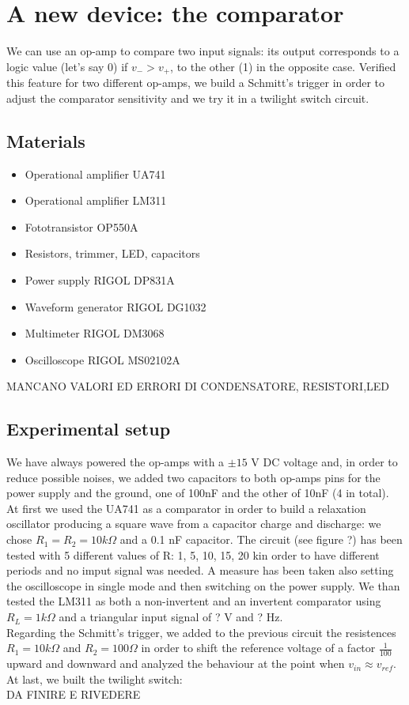 \chapter{A new device: the comparator}
We can use an op-amp to compare two input signals: its output corresponds to a logic value (let's say 0) if $v_- > v_+$, to the other (1) in the opposite case. Verified this feature for two different op-amps, we build a Schmitt's trigger in order to adjust the comparator sensitivity and we try it in a twilight switch circuit.

\section{Materials}
\begin{itemize}
\item Operational amplifier UA741
\item Operational amplifier LM311
\item Fototransistor OP550A
\item Resistors, trimmer, LED, capacitors
\item Power supply RIGOL DP831A
\item Waveform generator RIGOL DG1032
\item Multimeter RIGOL DM3068
\item Oscilloscope RIGOL MS02102A
\end{itemize}
MANCANO VALORI ED ERRORI DI CONDENSATORE, RESISTORI,LED

\section{Experimental setup}
We have always powered the op-amps with a $\pm15$ V DC voltage and, in order to reduce possible noises, we added two capacitors to both op-amps pins for the power supply and the ground, one of 100nF and the other of 10nF (4 in total).\\
At first we used the UA741 as a comparator in order to build a relaxation oscillator producing a square wave from a capacitor charge and discharge: we chose $R_1 = R_2 = 10k\Omega$ and a 0.1 nF capacitor. The circuit (see figure ?) has been tested with 5 different values of R: 1, 5, 10, 15, 20 k\Omega in order to have different periods and no imput signal was needed. A measure has been taken also setting the oscilloscope in single mode and then switching on the power supply.
We than tested the LM311 as both a non-invertent and an invertent comparator using $R_L = 1k\Omega$ and a triangular input signal of ? V and ? Hz.\\
Regarding the Schmitt's trigger, we added to the previous circuit the resistences $R_1 = 10 k\Omega$ and $R_2 = 100 \Omega$ in order to shift the reference voltage of a factor $\frac{1}{100}$ upward and downward and analyzed the behaviour at the point when $v_{in}\approx v_{ref}$.\\
At last, we built the twilight switch:\\
DA FINIRE E RIVEDERE


